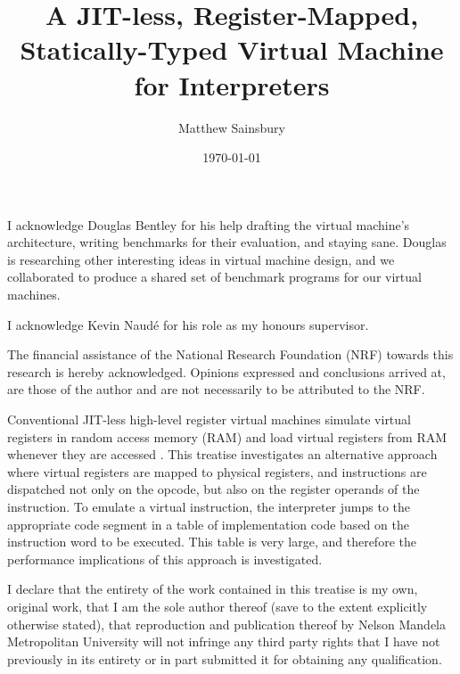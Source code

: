 



\title{A JIT-less, Register-Mapped, Statically-Typed Virtual Machine for Interpreters}
\author{Matthew Sainsbury}
\date{\today}

\begin{titlepage}

		\maketitle
	
\end{titlepage}


	I acknowledge Douglas Bentley for his help drafting the virtual machine's architecture, writing benchmarks for their evaluation, and staying sane. Douglas is researching other interesting ideas in virtual machine design, and we collaborated to produce a shared set of benchmark programs for our virtual machines.
	
	I acknowledge Kevin Naudé for his role as my honours supervisor.
	
	The financial assistance of the National Research Foundation (NRF) towards this research is hereby acknowledged. Opinions expressed and conclusions arrived at, are those of the author and are not necessarily to be attributed to the NRF.

	Conventional JIT-less high-level register virtual machines simulate virtual registers in random access memory (RAM) and load virtual registers from RAM whenever they are accessed \citep{caseregistervm}. This treatise investigates an alternative approach where virtual registers are mapped to physical registers, and instructions are dispatched not only on the opcode, but also on the register operands of the instruction. To emulate a virtual instruction, the interpreter jumps to the appropriate code segment in a table of implementation code based on the instruction word to be executed. This table is very large, and therefore the performance implications of this approach is investigated.

	I declare that the entirety of the work contained in this treatise is my own, original work, that I am the sole author thereof (save to the extent explicitly otherwise stated), that reproduction	and publication thereof by Nelson Mandela Metropolitan University will not infringe any third	party rights that I have not previously in its entirety or in part submitted it for obtaining any qualification.
	
